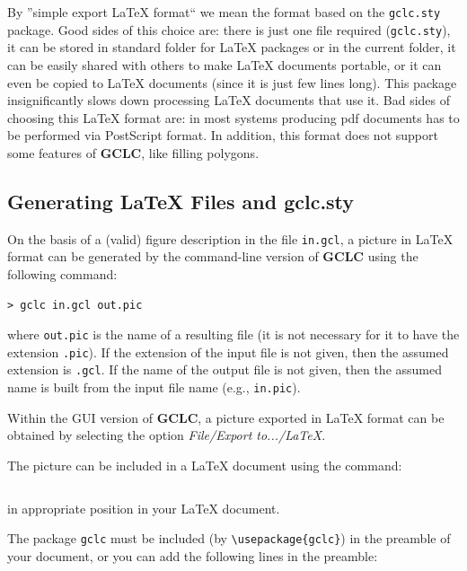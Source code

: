 \documentclass[a4paper]{book}
\newcommand{\gclc}{{\bfseries GCLC}\xspace}
\begin{document}
By ''simple export \LaTeX{} format`` we mean the format based on
the \verb|gclc.sty| package. Good sides of this choice are:
there is just one file required (\verb|gclc.sty|), it can be
stored in standard folder for \LaTeX{} packages or in the current
folder, it can be easily shared with others to make \LaTeX{}
documents portable, or it can even be copied to \LaTeX{} documents
(since it is just few lines long). This package insignificantly
slows down processing \LaTeX{} documents that use it.
Bad sides of choosing this \LaTeX{} format are: in most systems
producing {\sc pdf} documents has to be performed via {\sc PostScript}
format. In addition, this format does not support some features
of \gclc, like filling polygons.


\subsection{Generating \LaTeX{} Files and {\sc gclc.sty}}

On the basis of a (valid) figure description in the file \verb|in.gcl|,
a picture in \LaTeX{} format can be generated by the command-line
version of \gclc using the following command:

\begin{verbatim}
> gclc in.gcl out.pic
\end{verbatim}

\noindent
where \verb|out.pic| is the name of a resulting file (it is not
necessary for it to have the extension \verb|.pic|).
If the extension of the input file is not given, then the assumed
extension is \verb|.gcl|.
If the name of the output file is not given, then the assumed name
is built from the input file name (e.g., \verb|in.pic|).

Within the GUI version of \gclc, a picture exported in \LaTeX{} format 
can be obtained by selecting the option {\it File/Export to.../LaTeX}.

The picture can be included in a \LaTeX{} document using the
command:

\begin{verbatim}

\end{verbatim}

\noindent
in appropriate position in your \LaTeX{} document.

The package \verb|gclc| must be included (by \verb|\usepackage{gclc}|)
in the preamble of your document, or you can add the following lines
in the preamble:
\end{document}
